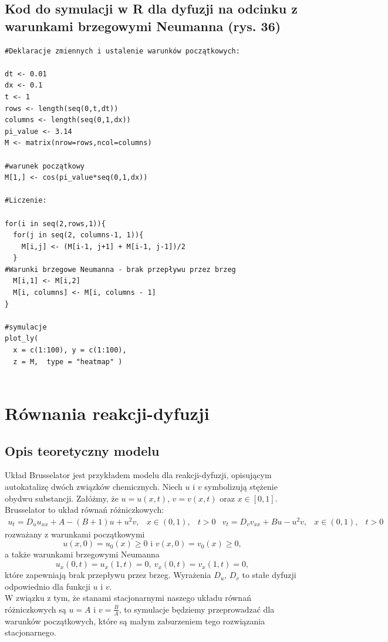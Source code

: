 \documentclass[a4paper,12pt]{article}
\begin{document}
\subsection{Kod do symulacji w R dla dyfuzji na odcinku z warunkami brzegowymi Neumanna (rys. 36)}

\begin{verbatim}
#Deklaracje zmiennych i ustalenie warunków początkowych:

dt <- 0.01
dx <- 0.1  
t <- 1
rows <- length(seq(0,t,dt))
columns <- length(seq(0,1,dx))
pi_value <- 3.14
M <- matrix(nrow=rows,ncol=columns)

#warunek początkowy
M[1,] <- cos(pi_value*seq(0,1,dx))

#Liczenie:

for(i in seq(2,rows,1)){
  for(j in seq(2, columns-1, 1)){
    M[i,j] <- (M[i-1, j+1] + M[i-1, j-1])/2
  }
#Warunki brzegowe Neumanna - brak przepływu przez brzeg
  M[i,1] <- M[i,2]
  M[i, columns] <- M[i, columns - 1]
}

#symulacje
plot_ly(
  x = c(1:100), y = c(1:100),
  z = M,  type = "heatmap" )


\end{verbatim}
\newpage
\section{Równania reakcji-dyfuzji}
\subsection{Opis teoretyczny modelu}
Układ Brusselator jest przykładem modelu dla reakcji-dyfuzji, opisującym autokatalizę dwóch związków chemicznych. 
Niech $u$ i $v$ symbolizują stężenie obydwu substancji. Załóżmy, że $u=u(x,t)$, $v=v(x,t)$ oraz $x\in[0,1].$ Brusselator to układ równań różniczkowych:
\begin{equation}
\begin{array}{lll}
u_t = D_uu_{xx}+A-(B+1)u+u^2v,&x\in(0,1),&t>0 &
v_t = D_vv_{xx}+Bu-u^2v,& x\in(0,1),& t>0 &
\end{array} 
\end{equation}
rozważany z warunkami początkowymi
$$u(x,0)=u_0(x)\geq0\textrm{ i } v(x,0)=v_0(x)\geq0,$$
a także warunkami brzegowymi Neumanna
$$u_x(0,t)=u_x(1,t)=0,\ v_x(0,t)=v_x(1,t)=0,$$
które zapewniają brak przepływu przez brzeg. Wyrażenia $D_u$, $D_v$ to stałe dyfuzji odpowiednio dla funkcji $u$ i $v$.\\ 
W związku z tym, że stanami stacjonarnymi naszego układu równań różniczkowych są $u=A$ i $v=\frac{B}{A}$, to symulacje będziemy przeprowadzać dla warunków początkowych, które są małym zaburzeniem tego rozwiązania stacjonarnego.
\end{document}
